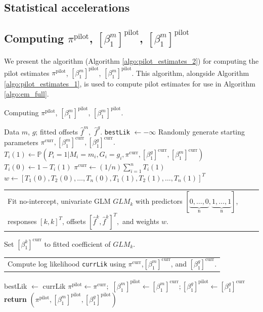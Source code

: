 \documentclass[12pt]{article}
\makeatletter
\newcommand{\multiline}[1]{%
	\begin{tabularx}{\dimexpr\linewidth-\ALG@thistlm}[t]{@{}X@{}}
		#1
	\end{tabularx}
}
\makeatother
\begin{document}
\begin{appendices}
\begin{refsection}
		\section{Statistical accelerations}\label{sec:statistical_accelerations}
		
		\subsection*{Computing $\pi^\textrm{pilot}$, $[\beta^m_1]^\textrm{pilot}$, $[\beta^m_1]^\textrm{pilot}$}
		
		We present the algorithm (Algorithm \ref{algo:pilot_estimates_2}) for computing the pilot estimates $\pi^\textrm{pilot}$, $[\beta^m_1]^\textrm{pilot}$, $[\beta^m_1]^\textrm{pilot}$. This algorithm, alongside Algorithm \ref{algo:pilot_estimates_1}, is used to compute pilot estimates for use in Algorithm \ref{algo:em_full}.
		
		\begin{algorithm}
			\caption{Computing $\pi^\textrm{pilot}$, $[\beta^m_1]^\textrm{pilot}$, $[\beta^m_1]^\textrm{pilot}$.}\label{algo:pilot_estimates_2}
			\begin{algorithmic}[2]
				\Require Data $m$, $g$; fitted offsets $\hat{f}^m,$ $\hat{f}^g$.
				\State \texttt{bestLik} $\gets -\infty$ 
				\State Randomly generate starting parameters $\pi^\textrm{curr}, [\beta_1^m]^\textrm{curr}, [\beta^g_1]^\textrm{curr}.$
				 
				\State $T_i(1) \gets \mathbb{P}(P_i = 1 | M_i = m_i, G_i = g_i, \pi^\textrm{curr}, [\beta^g_1]^\textrm{curr}, [\beta_1^m]^\textrm{curr})$
				\State $T_i(0) \gets 1 - T_i(1)$
				\EndFor
				\State $\pi^{\textrm{curr}} \gets (1/n) \sum_{i=1}^n T_i(1)$ 
				\State $w \gets [T_1(0), T_2(0), \dots, T_n(0), T_1(1), T_2(1), \dots, T_n(1)]^T$
				\State \multiline{Fit no-intercept, univariate GLM $GLM_k$ with predictors $[\underbrace{0, \dots, 0}_\textrm{n}, \underbrace{1, \dots, 1}_\textrm{n}]$, responses $[k,k]^T$, offsets $[\hat{f}^k, \hat{f}^k]^T,$ and weights $w$.}
				\State Set $[\beta^k_1]^\textrm{curr}$ to fitted coefficient of $GLM_k$.
				\EndFor
				\State \multiline{
					Compute log likelihood \texttt{currLik} using $\pi^\textrm{curr}$,$ [\beta^m_1]^\textrm{curr}$, and $[\beta^g_1]^\textrm{curr}.$}
				\EndWhile
				\State bestLik $\gets$ currLik
				\State $\pi^\textrm{pilot} \gets \pi^\textrm{curr};$ $[\beta^m_1]^\textrm{pilot} \gets [\beta^m_1]^\textrm{curr}; [\beta^g_1]^\textrm{pilot} \gets [\beta^g_1]^\textrm{curr}$
				\EndIf
				\EndFor
				\State \textbf{return} $(\pi^\textrm{pilot}, [\beta^m_1]^\textrm{pilot}, [\beta^g_1]^\textrm{pilot})$
			\end{algorithmic}
		\end{algorithm}
		

\end{refsection}
\end{appendices}
\end{document}

